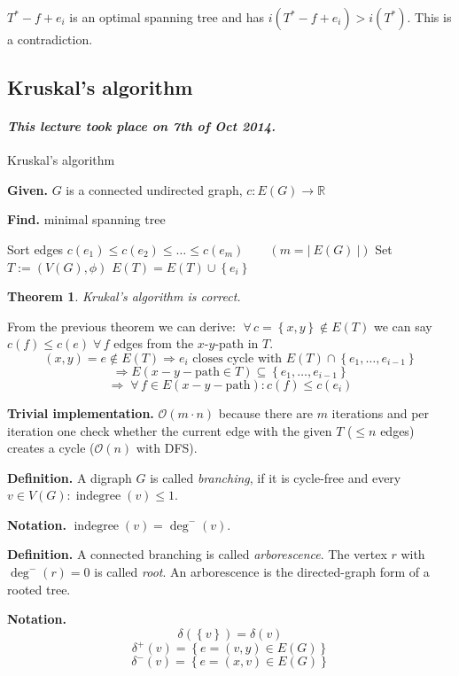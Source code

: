 \documentclass{article}
\newtheorem{theorem}{Theorem}
\newcommand{\card}[1]{\left|\:\!#1\:\!\right|}
\newcommand{\set}[1]{\left\{#1\right\}}
\newcommand{\given}[1]{\textbf{Given.} #1\par}
\newcommand{\find}[1]{\textbf{Find.} #1\par}
\newcommand{\dateref}[1]{\paragraph{\textit{This lecture took place on #1.}}}
\newcommand{\gath}[2]{$#1$-$#2$-path} %
\newcommand{\fall}{\;\forall\,}
\begin{document}
$T^* - f + e_i$ is an optimal spanning tree and has $i(T^* - f + e_i) > i(T^*)$. This is a contradiction.

\subsection{Kruskal's algorithm}
%
\dateref{7th of Oct 2014}

\begin{algorithm}
  \caption{Kruskal's algorithm}
  \label{kruskals-algo}
  \given{$G$ is a connected undirected graph, $c: E(G) \rightarrow \mathbb{R}$}
  \find{minimal spanning tree}
\begin{algorithmic}[1]
  \State Sort edges $c(e_1) \leq c(e_2) \leq \ldots \leq c(e_m) \qquad (m = \card{E(G)})$
  \State Set $T := (V(G), \phi)$
    \If{$T \cup \set{e_i}$ is cycle-free}
      \State $E(T) = E(T) \cup \set{e_i}$
    \EndIf
  \EndFor
\end{algorithmic}
\end{algorithm}

\begin{theorem}\label{satz-2.3}
  Krukal's algorithm is correct.
\end{theorem}

From the previous theorem we can derive: $\fall c = \set{x, y} \notin E(T)$ we can say $c(f) \leq c(e) \fall f$ edges from the \gath xy in $T$.
\[
    (x, y) = e \notin E(T) \Rightarrow e_i \text{ closes cycle with } E(T) \cap \set{e_1, \ldots, e_{i-1}}
\] \[
    \Rightarrow E(x-y-\text{path} \in T) \subseteq \set{e_1, \ldots, e_{i-1}}
\] \[
    \Rightarrow \fall f \in E(x-y-\text{path}): c(f) \leq c(e_i)
\]

\textbf{Trivial implementation.}
  $\mathcal{O}(m\cdot n)$ because there are $m$ iterations and per iteration one check whether the current edge with the given $T$ ($\leq n$ edges) creates a cycle ($\mathcal{O}(n)$ with DFS).

\textbf{Definition.}
  A digraph $G$ is called \emph{branching}, if it is cycle-free and every $v \in V(G): \operatorname{indegree}(v) \leq 1$.

\textbf{Notation.}
  $\operatorname{indegree}(v) = \operatorname{deg}^-(v)$.

\textbf{Definition.}
  A connected branching is called \emph{arborescence}. The vertex $r$ with $\operatorname{deg}^-(r) = 0$ is called \emph{root}.
  An arborescence is the directed-graph form of a rooted tree.

\textbf{Notation.}
  \[
    \delta(\set{v}) = \delta(v)
  \] \[
    \delta^+(v) = \set{e = (v, y) \in E(G)}
  \] \[
    \delta^-(v) = \set{e = (x, v) \in E(G)}
  \]
\end{document}
